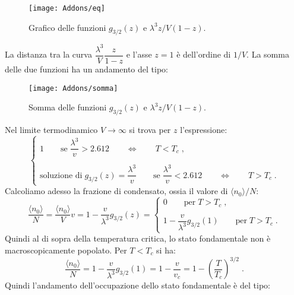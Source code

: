 \documentclass[10pt,a4paper]{report}
\theoremstyle{definition}
\numberwithin{equation}{section}
\newcommand{\bra}{\langle}
\newcommand{\ket}{\rangle}
\begin{document}
\begin{figure}[h]
\centering
\texttt{[image: Addons/eq]}
\caption{Grafico delle funzioni $g_{3/2}(z)$ e $\lambda^3 z/V(1-z)$.}
\end{figure}

La distanza tra la curva $\dfrac{\lambda^3}{V}\dfrac{z}{1-z}$ e l'asse $z=1$ è dell'ordine di $1/V$. La somma delle due funzioni ha un andamento del tipo:

\begin{figure}[h]
\centering
\texttt{[image: Addons/somma]}
\caption{Somma delle funzioni $g_{3/2}(z)$ e $\lambda^3z/V(1-z)$.}
\end{figure}
\pagebreak

Nel limite termodinamico $V\to\infty$ si trova per $z$ l'espressione:
\begin{equation}
\begin{cases}
1\qquad \mbox{se}\; \dfrac{\lambda^3}{v}>2.612\qquad\Longleftrightarrow\qquad T<T_c\;, \\
\\
\mbox{soluzione di}\; g_{3/2}(z)=\dfrac{\lambda^3}{v}\qquad \mbox{se}\;\dfrac{\lambda^3}{v}<2.612\qquad \Longleftrightarrow \qquad T>T_c\;.
\end{cases}
\end{equation}
Calcoliamo adesso la frazione di condensato, ossia il valore di $\bra n_0\ket/N$:
\begin{equation}
\frac{\bra n_0\ket}{N}=\frac{\bra n_0\ket}{V}v=1-\frac{v}{\lambda^3}g_{3/2}(z)=\begin{cases}
0\qquad \mbox{per}\; T>T_c\;, \\
\\
1-\dfrac{v}{\lambda^3}g_{3/2}(1)\qquad\mbox{per}\; T>T_c\;.
\end{cases}
\end{equation}
Quindi al di sopra della temperatura critica, lo stato fondamentale non è macroscopicamente popolato. Per $T<T_c$ si ha:
\begin{equation}
\frac{\bra n_0\ket}{N}=1-\frac{v}{\lambda^3}g_{3/2}(1)=1-\frac{v}{v_c}=1-\left(\frac{T}{T_c}\right)^{3/2}\;.
\end{equation}
Quindi l'andamento dell'occupazione dello stato fondamentale è del tipo:
\end{document}
